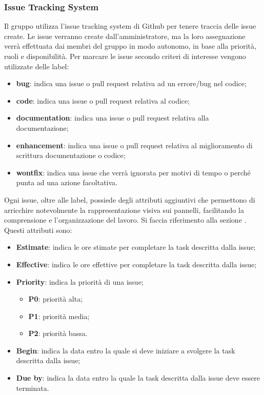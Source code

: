         \subsubsection{Issue Tracking System}\label{inf:its}
        Il gruppo utilizza l'issue tracking system di Github per tenere traccia delle issue create. Le issue verranno
        create dall'amministratore, ma la loro assegnazione verrà effettuata dai membri del gruppo in modo autonomo, in base
        alla priorità, ruoli e disponibilità.
        Per marcare le issue secondo criteri di interesse vengono utilizzate delle label:
        \begin{itemize}
            \item \textbf{bug}: indica una issue o pull request relativa ad un errore/bug nel codice;
            \item \textbf{code}: indica una issue o pull request relativa al codice;
            \item \textbf{documentation}: indica una issue o pull request relativa alla documentazione;
            \item \textbf{enhancement}: indica una issue o pull request relativa al miglioramento di scrittura documentazione o codice;
            \item \textbf{wontfix}: indica una issue che verrà ignorata per motivi di tempo o perché punta ad una azione facoltativa.
        \end{itemize}
        Ogni issue, oltre alle label, possiede degli attributi aggiuntivi che permettono di arricchire
        notevolmente la rappresentazione visiva sui pannelli, facilitando la comprensione e l'organizzazione del lavoro.
        Si faccia riferimento alla sezione .
        Questi attributi sono:
        \begin{itemize}
            \item \textbf{Estimate}: indica le ore stimate per completare la task descritta dalla issue;
            \item \textbf{Effective}: indica le ore effettive per completare la task descritta dalla issue;
            \item \textbf{Priority}: indica la priorità di una issue;
            \begin{itemize}
                \item \textbf{P0}: priorità alta;
                \item \textbf{P1}: priorità media;
                \item \textbf{P2}: priorità bassa.
            \end{itemize}
            \item \textbf{Begin}: indica la data entro la quale si deve iniziare a svolgere la task descritta dalla issue;
            \item \textbf{Due by}: indica la data entro la quale la task descritta dalla issue deve essere terminata.
        \end{itemize}

